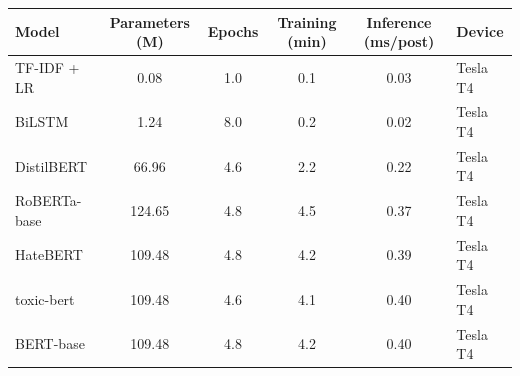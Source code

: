 \begin{tabular}{lccccl}
\toprule
Model & Parameters (M) & Epochs & Training (min) & Inference (ms/post) & Device \\
\midrule
TF-IDF + LR & 0.08 & 1.0 & 0.1 & 0.03 & Tesla T4 \\
BiLSTM & 1.24 & 8.0 & 0.2 & 0.02 & Tesla T4 \\
DistilBERT & 66.96 & 4.6 & 2.2 & 0.22 & Tesla T4 \\
RoBERTa-base & 124.65 & 4.8 & 4.5 & 0.37 & Tesla T4 \\
HateBERT & 109.48 & 4.8 & 4.2 & 0.39 & Tesla T4 \\
toxic-bert & 109.48 & 4.6 & 4.1 & 0.40 & Tesla T4 \\
BERT-base & 109.48 & 4.8 & 4.2 & 0.40 & Tesla T4 \\
\bottomrule
\end{tabular}

